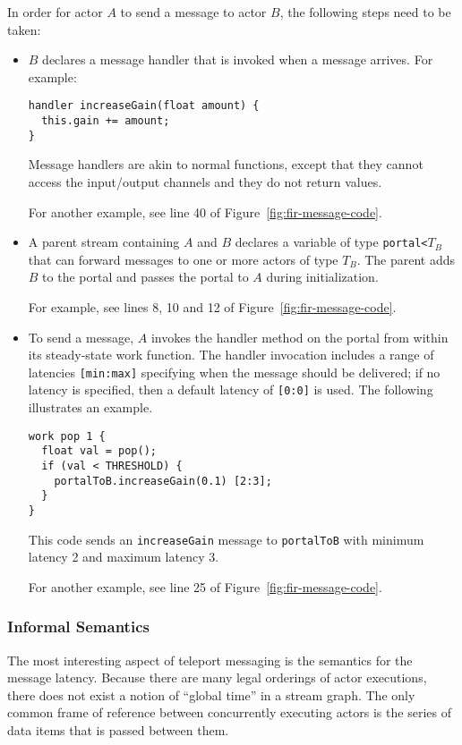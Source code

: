 In order for actor $A$ to send a message to actor $B$, the following
steps need to be taken:
\begin{itemize}

\item $B$ declares a message handler that is invoked when a
message arrives.  For example: {
\begin{verbatim}
handler increaseGain(float amount) {
  this.gain += amount;
}
\end{verbatim}
}
Message handlers are akin to normal functions, except that they
cannot access the input/output channels and they do not return values.

For another example, see line 40 of Figure~\ref{fig:fir-message-code}.

\item A parent stream containing $A$ and $B$ declares a variable of
type {\tt portal<}$T_B$\hspace{-1pt}{\tt >} that can forward messages
to one or more actors of type $T_B$.  The parent adds $B$ to the
portal and passes the portal to $A$ during initialization.

For example, see lines 8, 10 and 12 of Figure~\ref{fig:fir-message-code}.

\item To send a message, $A$ invokes the handler method on the portal
from within its steady-state work function. The handler invocation
includes a range of latencies {\tt [min:max]} specifying when the
message should be delivered; if no latency is specified, then a
default latency of {\tt [0:0]} is used.  The following illustrates an
example.
\begin{verbatim}
work pop 1 {
  float val = pop();
  if (val < THRESHOLD) {
    portalToB.increaseGain(0.1) [2:3];
  }
}
\end{verbatim}
This code sends an {\tt increaseGain} message to {\tt portalToB} with
minimum latency 2 and maximum latency 3.

For another example, see line 25 of Figure~\ref{fig:fir-message-code}.
\end{itemize}

\subsubsection*{Informal Semantics}

The most interesting aspect of teleport messaging is the semantics for
the message latency.  Because there are many legal orderings of actor
executions, there does not exist a notion of ``global time'' in a
stream graph.  The only common frame of reference between concurrently
executing actors is the series of data items that is passed between
them.

